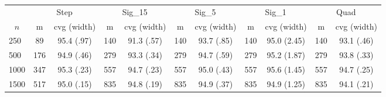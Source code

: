 \begin{tabular}{lcccccccccc}
   \toprule
 
           & \multicolumn{2}{c}{Step}& \multicolumn{2}{c}{Sig\_15}& \multicolumn{2}{c}{Sig\_5}& \multicolumn{2}{c}{Sig\_1}& \multicolumn{2}{c}{Quad} \\ 
             \cmidrule(l{2pt}r{2pt}){2-3} \cmidrule(l{2pt}r{2pt}){4-5} \cmidrule(l{2pt}r{2pt}){6-7} \cmidrule(l{2pt}r{2pt}){8-9}  \cmidrule(l{2pt}r{2pt}){10-11} 
             \multicolumn{1}{c}{$n$} & \multicolumn{1}{c}{m}& \multicolumn{1}{c}{cvg (width)}& \multicolumn{1}{c}{m}& \multicolumn{1}{c}{cvg (width)}& \multicolumn{1}{c}{m}& \multicolumn{1}{c}{cvg (width)}& \multicolumn{1}{c}{m}& \multicolumn{1}{c}{cvg (width)}& \multicolumn{1}{c}{m}& \multicolumn{1}{c}{cvg (width)} \\ \midrule 
        250 & 89 & 95.4 (.97) & 140 & 91.3 (.57) & 140 & 93.7 (.85) & 140 & 95.0 (2.45) & 140 & 93.1 (.46) \\ 
  500 & 176 & 94.9 (.46) & 279 & 93.3 (.34) & 279 & 94.7 (.59) & 279 & 95.2 (1.87) & 279 & 93.8 (.33) \\ 
  1000 & 347 & 95.3 (.23) & 557 & 94.7 (.23) & 557 & 95.0 (.43) & 557 & 95.6 (1.45) & 557 & 94.7 (.25) \\ 
  1500 & 517 & 95.0 (.15) & 835 & 94.8 (.19) & 835 & 94.9 (.37) & 835 & 94.9 (1.25) & 835 & 94.1 (.21) \\ 
   \hline
\end{tabular}
